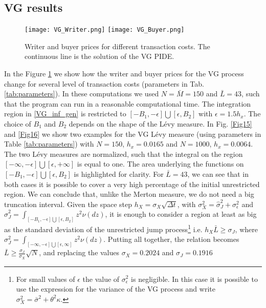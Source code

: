 \subsection{VG results}\label{num_sec_VG}

\begin{figure}[t!]
   \centering
   \texttt{[image: VG\_Writer.png]}
   \texttt{[image: VG\_Buyer.png]}
 \caption{Writer and buyer prices for different transaction costs. The continuous line is the solution of the VG PIDE.}
 \label{Fig8}
\end{figure}  

In the Figure \ref{Fig8} we show how the writer and buyer prices for the VG process change for several level of transaction costs (parameters in Tab. \ref{tab:parameters}). 
In these computations we used $N=\bar M = 150$ and $\bar L = 43$, such that the program can run in a reasonable computational time. 
The integration region in \ref{VG_inf_gen} is restricted to $[-B_1,-\epsilon]\bigcup [\epsilon,B_2]$ with $\epsilon=1.5h_x$. The choice of $B_1$ and $B_2$ depends on the shape of the 
L\'evy measure. 
In Fig. \ref{Fig15} and \ref{Fig16} we show two examples for the VG L\'evy measure (using parameters in Table \ref{tab:parameters}) with $N=150$, $h_x=0.0165$ and $N=1000$, $h_x=0.0064$. 
The two L\'evy measures are normalized, such that the integral on the region $[-\infty,-\epsilon]\bigcup [\epsilon,+\infty]$ is equal to one. The 
area underlying the functions on $[-B_1,-\epsilon]\bigcup [\epsilon,B_2]$ is highlighted for clarity.
For $\bar L = 43$, we can see that in both cases it is possible to cover a very high percentage of the initial unrestricted region. We can conclude that, unlike the Merton
measure, we do not need a big truncation interval.
Given the space step $h_X = \sigma_X\sqrt{\Delta t}$, with  
$ \sigma_X^2 = \hat \sigma_{J}^2 + \sigma_{\epsilon}^2 $ and $\hat \sigma_J^2 = \int_{[-B_1,-\epsilon]\bigcup [\epsilon,B_2]} z^2 \nu(dz)$, 
it is enough to consider a region at least as big as the standard deviation  
of the unrestricted jump process\footnote{For small values of $\epsilon$ the value of $\sigma_{\epsilon}^2$ is negligible. In this case it is possible to use the expression for the 
variance of the VG process and write $\sigma_X^2 = \bar \sigma^2 + \theta^2 \kappa$.}
i.e. $h_X \bar L \geq \sigma_J$, where $\sigma_J^2 = \int_{[-\infty,-\epsilon]\bigcup [\epsilon,\infty]} z^2 \nu(dz)$. 
Putting all together, the relation becomes $\bar L\geq \frac{\sigma_J}{\sigma_X} \sqrt{N}$, and replacing the values $\sigma_X = 0.2024$ and $\sigma_J=0.1916$ 
